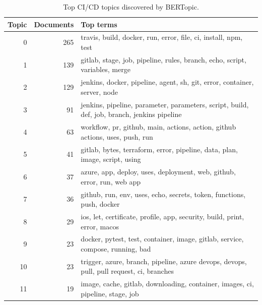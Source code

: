 \begin{table}[t]
\centering
\small
\begin{tabular}{r r p{9cm}}
\hline
Topic & Documents & Top terms \\ \hline
0 & 265 & travis, build, docker, run, error, file, ci, install, npm, test \\
1 & 139 & gitlab, stage, job, pipeline, rules, branch, echo, script, variables, merge \\
2 & 129 & jenkins, docker, pipeline, agent, sh, git, error, container, server, node \\
3 & 91 & jenkins, pipeline, parameter, parameters, script, build, def, job, branch, jenkins pipeline \\
4 & 63 & workflow, pr, github, main, actions, action, github actions, uses, push, run \\
5 & 41 & gitlab, bytes, terraform, error, pipeline, data, plan, image, script, using \\
6 & 37 & azure, app, deploy, uses, deployment, web, github, error, run, web app \\
7 & 36 & github, run, env, uses, echo, secrets, token, functions, push, docker \\
8 & 29 & ios, let, certificate, profile, app, security, build, print, error, macos \\
9 & 23 & docker, pytest, test, container, image, gitlab, service, compose, running, bad \\
10 & 23 & trigger, azure, branch, pipeline, azure devops, devops, pull, pull request, ci, branches \\
11 & 19 & image, cache, gitlab, downloading, container, images, ci, pipeline, stage, job \\
\hline
\end{tabular}
\caption{Top CI/CD topics discovered by BERTopic.}
\label{tab:top_topics}
\end{table}